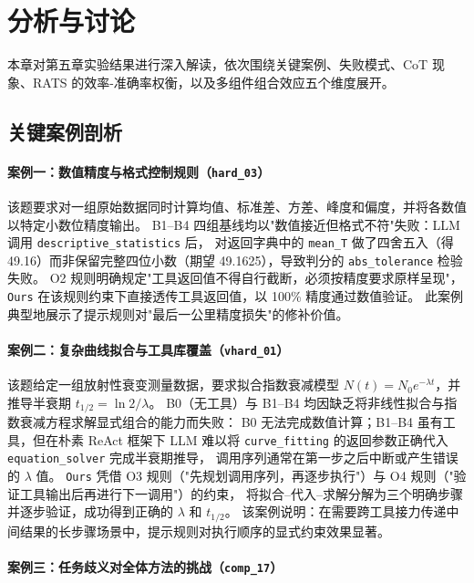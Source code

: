 \clearpage

\section{分析与讨论}

本章对第五章实验结果进行深入解读，依次围绕关键案例、失败模式、CoT 现象、RATS 的效率-准确率权衡，以及多组件组合效应五个维度展开。

\subsection{关键案例剖析}\label{sec:analysis-cases}

\paragraph{案例一：数值精度与格式控制规则（\texttt{hard\_03}）}

该题要求对一组原始数据同时计算均值、标准差、方差、峰度和偏度，并将各数值以特定小数位精度输出。
B1--B4 四组基线均以"数值接近但格式不符"失败：LLM 调用 \texttt{descriptive\_statistics} 后，
对返回字典中的 \texttt{mean\_T} 做了四舍五入（得 49.16）而非保留完整四位小数（期望 49.1625），导致判分的 \texttt{abs\_tolerance} 检验失败。
O2 规则明确规定"工具返回值不得自行截断，必须按精度要求原样呈现"，\texttt{Ours} 在该规则约束下直接透传工具返回值，以 100\% 精度通过数值验证。
此案例典型地展示了提示规则对"最后一公里精度损失"的修补价值。

\paragraph{案例二：复杂曲线拟合与工具库覆盖（\texttt{vhard\_01}）}

该题给定一组放射性衰变测量数据，要求拟合指数衰减模型 $N(t) = N_0 e^{-\lambda t}$，并推导半衰期 $t_{1/2} = \ln 2 / \lambda$。
B0（无工具）与 B1--B4 均因缺乏将非线性拟合与指数衰减方程求解显式组合的能力而失败：
B0 无法完成数值计算；B1--B4 虽有工具，但在朴素 ReAct 框架下 LLM 难以将 \texttt{curve\_fitting} 的返回参数正确代入 \texttt{equation\_solver} 完成半衰期推导，
调用序列通常在第一步之后中断或产生错误的 $\lambda$ 值。
\texttt{Ours} 凭借 O3 规则（"先规划调用序列，再逐步执行"）与 O4 规则（"验证工具输出后再进行下一调用"）的约束，
将拟合--代入--求解分解为三个明确步骤并逐步验证，成功得到正确的 $\lambda$ 和 $t_{1/2}$。
该案例说明：在需要跨工具接力传递中间结果的长步骤场景中，提示规则对执行顺序的显式约束效果显著。

\paragraph{案例三：任务歧义对全体方法的挑战（\texttt{comp\_17}）}

